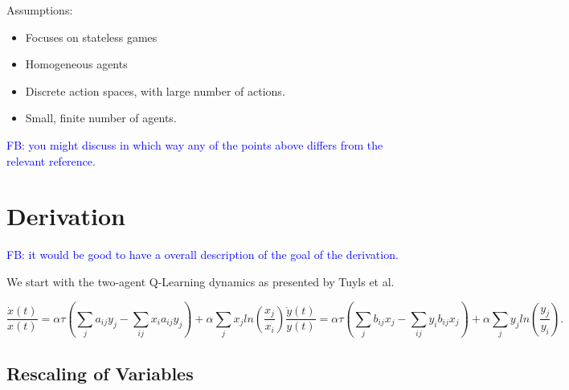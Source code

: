 \documentclass{article}
\newcommand\fb[1]{\textcolor{blue}{FB: #1}}
\begin{document}
	Assumptions:

	\begin{itemize}
		\item Focuses on stateless games
		\item Homogeneous agents
		\item Discrete action spaces, with large number of actions.
		\item Small, finite number of agents.
	\end{itemize}


 \fb{you might discuss in which way any of the points above differs from the relevant reference.}
        
	



	\section{Derivation} %
	\label{sec:derivation}

        \fb{it would be good to have a overall description of the goal of the derivation.}
	
	We start with the two-agent Q-Learning dynamics as presented by Tuyls et al.

	\begin{subequations}
	\label{eqn::EOM}
		\begin{equation}
			\frac{\dot{x}(t)}{x(t)} = \alpha \tau (\sum_{j} a_{ij} y_j - \sum_{i j} x_i a_{ij} y_j)
			+ \alpha \sum_j x_j ln(\frac{x_j}{x_i}) 
		\end{equation}
		\begin{equation}
			\frac{\dot{y}(t)}{y(t)} = \alpha \tau (\sum_{j} b_{ij} x_j - \sum_{i j} y_i b_{ij} x_j)
			+ \alpha \sum_j y_j ln(\frac{y_j}{y_i}).
		\end{equation}
	\end{subequations}

	\subsection{Rescaling of Variables} %
	\label{sub:rescaling_of_variables}
	
\end{document}
